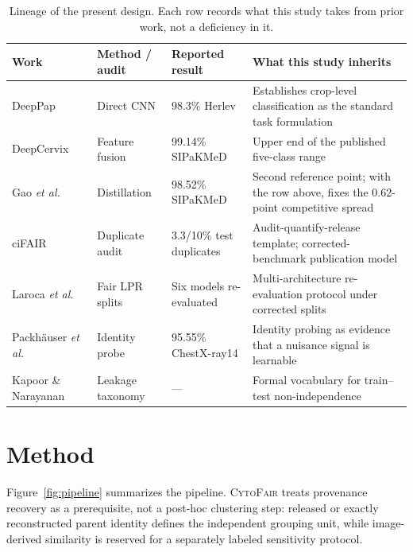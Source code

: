 \documentclass[conference]{IEEEtran}
\newcommand{\cytofair}{\textsc{CytoFair}}
\begin{document}
\begin{table}[t]
\caption{Lineage of the present design. Each row records what this study takes from prior work, not a deficiency in it.}
\label{tab:prior}
\centering
\scriptsize
\setlength{\tabcolsep}{8pt}
\begin{tabular}{p{}p{}p{}p{}}
\toprule
Work & Method / audit & Reported result & What this study inherits \\
\midrule
DeepPap~\cite{zhang2017deeppap} & Direct CNN & 98.3\% Herlev & Establishes crop-level classification as the standard task formulation \\
DeepCervix~\cite{rahaman2021deepcervix} & Feature fusion & 99.14\% SIPaKMeD & Upper end of the published five-class range \\
Gao \emph{et al.}~\cite{gao2022knowledge} & Distillation & 98.52\% SIPaKMeD & Second reference point; with the row above, fixes the 0.62-point competitive spread \\
ciFAIR~\cite{barz2020cifair} & Duplicate audit & 3.3/10\% test duplicates & Audit-quantify-release template; corrected-benchmark publication model \\
Laroca \emph{et al.}~\cite{laroca2023lpr} & Fair LPR splits & Six models re-evaluated & Multi-architecture re-evaluation protocol under corrected splits \\
Packh\"auser \emph{et al.}~\cite{packhauser2022reidentification} & Identity probe & 95.55\% ChestX-ray14 & Identity probing as evidence that a nuisance signal is learnable \\
Kapoor \& Narayanan~\cite{kapoor2023leakage} & Leakage taxonomy & --- & Formal vocabulary for train--test non-independence \\
\bottomrule
\end{tabular}
\end{table}

\section{Method}
Figure~\ref{fig:pipeline} summarizes the pipeline.
\cytofair{} treats provenance recovery as a prerequisite, not a post-hoc clustering step: released or exactly reconstructed parent identity defines the independent grouping unit, while image-derived similarity is reserved for a separately labeled sensitivity protocol.
\end{document}
